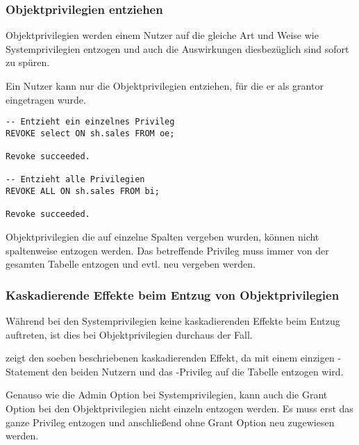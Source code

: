         \subsubsection{Objektprivilegien entziehen}
          Objektprivilegien werden einem Nutzer auf die gleiche Art und Weise wie Systemprivilegien entzogen und auch die Auswirkungen diesbez\"uglich sind sofort zu sp\"uren.
          \begin{merke}
            Ein Nutzer kann nur die Objektprivilegien entziehen, f\"ur die er als grantor eingetragen wurde.
          \end{merke}
          \begin{lstlisting}[caption={Entziehen von Objektprivilegien},label=admin244,language=oracle_sql]
-- Entzieht ein einzelnes Privileg
REVOKE select ON sh.sales FROM oe;

Revoke succeeded.

-- Entzieht alle Privilegien
REVOKE ALL ON sh.sales FROM bi;

Revoke succeeded.
          \end{lstlisting}
          \begin{merke}
            Objektprivilegien die auf einzelne Spalten vergeben wurden, k\"onnen nicht spaltenweise entzogen werden. Das betreffende Privileg muss immer von der gesamten Tabelle entzogen und evtl. neu vergeben werden.
          \end{merke}
        \subsubsection{Kaskadierende Effekte beim Entzug von Objektprivilegien}
          W\"ahrend bei den Systemprivilegien keine kaskadierenden Effekte beim
          Entzug auftreten, ist dies bei Objektprivilegien durchaus der Fall.

           zeigt den soeben beschriebenen kaskadierenden
          Effekt, da mit einem einzigen -Statement den
          beiden Nutzern  und  das
          -Privileg auf die Tabelle 
          entzogen wird.
          \begin{merke}
            Genauso wie die Admin Option bei Systemprivilegien, kann auch die
            Grant Option bei den Objektprivilegien nicht einzeln entzogen
            werden. Es muss erst das ganze Privileg entzogen und
            anschlie\ss{}end ohne Grant Option neu zugewiesen werden.
          \end{merke}
          
